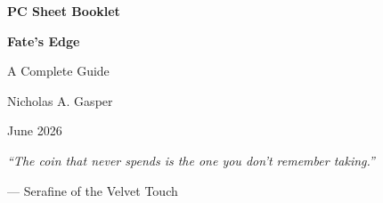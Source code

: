 \begin{titlepage}
\centering
\vspace*{1cm}

{\Huge\bfseries PC Sheet Booklet\par}
\vspace{0.3cm}
{\Large\bfseries Fate's Edge\par}
\vspace{0.5cm}
{\large A Complete Guide\par}
\vspace{2cm}

{\large Nicholas A. Gasper\par}
\vspace{0.3cm}
{\large June 2026\par}

\vfill
{\large \textit{``The coin that never spends is the one you don't remember taking.''}\par}
\vspace{0.2cm}
{\large --- Serafine of the Velvet Touch\par}

\end{titlepage}
